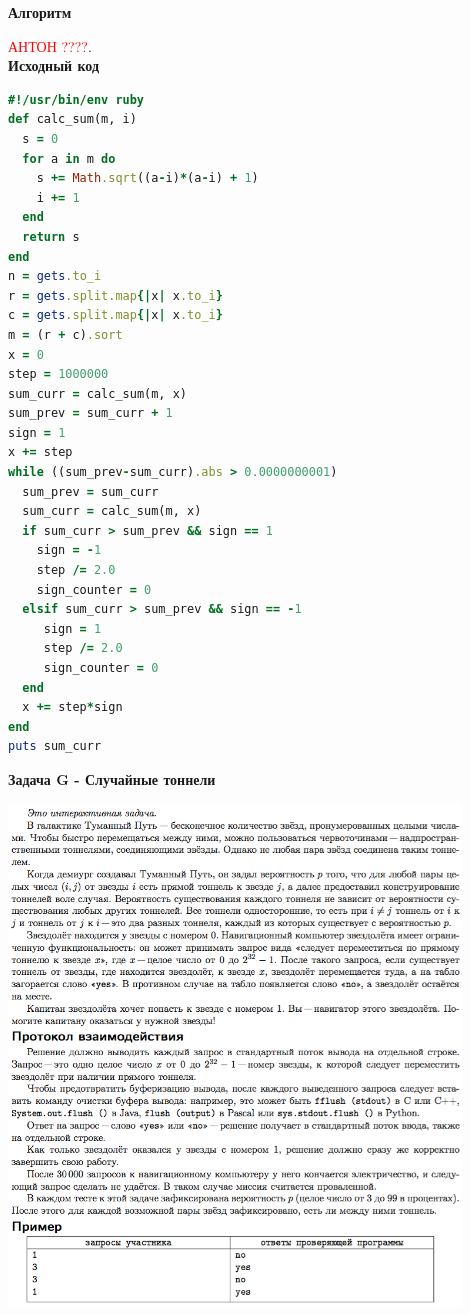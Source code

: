 \documentclass[a4paper,12pt]{article}
\begin{document}
\textbf{{\large Алгоритм}}

\textcolor{red}{\Huge{АНТОН ????}}. \\

\newpage
\textbf{{\large Исходный код}} \\
\begin{lstlisting}[language=Ruby]
#!/usr/bin/env ruby
def calc_sum(m, i)
  s = 0
  for a in m do
    s += Math.sqrt((a-i)*(a-i) + 1)
    i += 1
  end
  return s
end
n = gets.to_i
r = gets.split.map{|x| x.to_i}
c = gets.split.map{|x| x.to_i}
m = (r + c).sort
x = 0
step = 1000000
sum_curr = calc_sum(m, x)
sum_prev = sum_curr + 1
sign = 1
x += step
while ((sum_prev-sum_curr).abs > 0.0000000001)
  sum_prev = sum_curr
  sum_curr = calc_sum(m, x)
  if sum_curr > sum_prev && sign == 1
    sign = -1
    step /= 2.0
    sign_counter = 0
  elsif sum_curr > sum_prev && sign == -1
     sign = 1
     step /= 2.0
     sign_counter = 0
  end
  x += step*sign
end
puts sum_curr

\end{lstlisting}

\newpage
\textbf{{\large Задача G - Случайные тоннели}}

\begin{center}
\includegraphics[width=0.9\textwidth]{OC_Peterhof/G.png}\\ [1cm]
\end{center}
\end{document}
